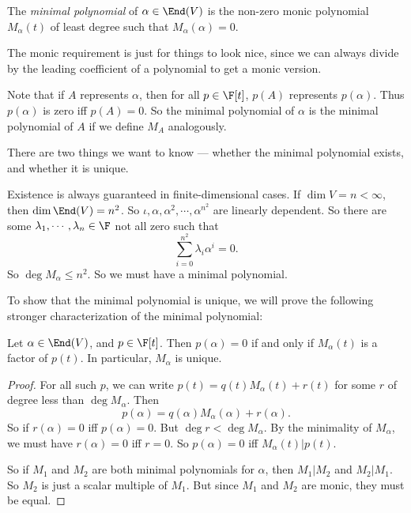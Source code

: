 \documentclass[a4paper]{article}
\begin{document}
\begin{defi}
  The \emph{minimal polynomial} of $\alpha \in \End(V)$ is the non-zero monic polynomial $M_\alpha(t)$ of least degree such that $M_\alpha(\alpha) = 0$.
\end{defi}
The monic requirement is just for things to look nice, since we can always divide by the leading coefficient of a polynomial to get a monic version.

Note that if $A$ represents $\alpha$, then for all $p \in \F[t]$, $p(A)$ represents $p(\alpha)$. Thus $p(\alpha)$ is zero iff $p(A) = 0$. So the minimal polynomial of $\alpha$ is the minimal polynomial of $A$ if we define $M_A$ analogously.

There are two things we want to know --- whether the minimal polynomial exists, and whether it is unique.

Existence is always guaranteed in finite-dimensional cases. If $\dim V = n < \infty$, then $\dim \End(V) = n^2$. So $\iota, \alpha, \alpha^2, \cdots, \alpha^{n^2}$ are linearly dependent. So there are some $\lambda_1, \cdots, \lambda_n \in \F$ not all zero such that
\[
  \sum_{i = 0}^{n^2} \lambda_i \alpha^i = 0.
\]
So $\deg M_\alpha \leq n^2$. So we must have a minimal polynomial.

To show that the minimal polynomial is unique, we will prove the following stronger characterization of the minimal polynomial:
\begin{lemma}
  Let $\alpha \in \End(V)$, and $p \in \F[t]$. Then $p(\alpha) = 0$ if and only if $M_\alpha(t)$ is a factor of $p(t)$. In particular, $M_\alpha$ is unique.
\end{lemma}

\begin{proof}
  For all such $p$, we can write $p(t) = q(t) M_\alpha(t) + r(t)$ for some $r$ of degree less than $\deg M_\alpha$. Then
  \[
    p(\alpha) = q(\alpha) M_\alpha(\alpha) + r(\alpha).
  \]
  So if $r(\alpha) = 0$ iff $p(\alpha) = 0$. But $\deg r < \deg M_\alpha$. By the minimality of $M_\alpha$, we must have $r(\alpha) = 0$ iff $r = 0$. So $p(\alpha) = 0$ iff $M_\alpha(t) | p(t)$.

  So if $M_1$ and $M_2$ are both minimal polynomials for $\alpha$, then $M_1 | M_2$ and $M_2 | M_1$. So $M_2$ is just a scalar multiple of $M_1$. But since $M_1$ and $M_2$ are monic, they must be equal.
\end{proof}
\end{document}
